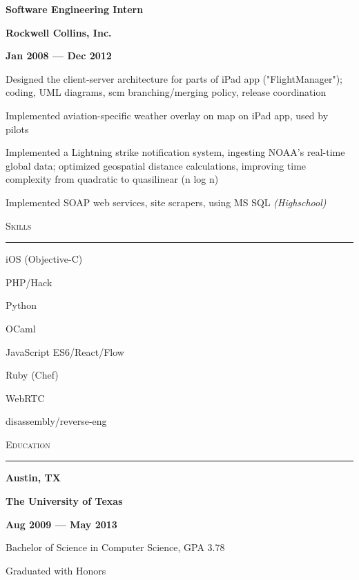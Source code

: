 \documentclass[letterpaper,12pt,oneside]{article}
\newcommand{\Heading}[1]{%
  \vspace{2ex}
  {\large\textsc{#1}} \\
  \vspace{-2ex}
  \hrule
}
\newcommand{\OneThirdBox}[1]{%
  \parbox{.333\textwidth}{#1}%
}
\newcommand{\LeftCenterRight}[4][\normalfont]{%
  \OneThirdBox{%
    \begin{flushleft}%
      #1{#2}%
    \end{flushleft}%
  }%
  \OneThirdBox{%
    \begin{center}%
      #1{#3}%
    \end{center}%
  }%
  \OneThirdBox{%
    \begin{flushright}%
      #1{#4}%
    \end{flushright}%
  }%
}
\newenvironment{Role}[4]
{
  \LeftCenterRight[\textbf]{#1}{#2}{#3 --- #4}
  \begin{compactitem}
  \vspace{-2ex}
}
{
  \end{compactitem}
  \vspace{-1ex}
}
\begin{document}
\begin{Role}
{Software Engineering Intern}
{Rockwell Collins, Inc.}
{Jan 2008}{Dec 2012}
  \item Designed the client-server architecture for parts of iPad app
    ("FlightManager"); coding, UML diagrams, scm branching/merging policy,
    release coordination
  \item Implemented aviation-specific weather overlay on map on iPad app, used
    by pilots
  \item Implemented a Lightning strike notification system, ingesting NOAA's
    real-time global data; optimized geospatial distance calculations,
    improving time complexity from quadratic to quasilinear (n log n)
  \item Implemented SOAP web services, site scrapers, using MS SQL
    \emph{(Highschool)}
\end{Role}


\Heading{Skills}
\vspace{2ex}
\begin{multicols}{3}
\small
\begin{compactitem}
  \item iOS (Objective-C)
  \item PHP/Hack
  \item Python
  \item OCaml
  \item JavaScript ES6/React/Flow
  \item Ruby (Chef)
  \item WebRTC
  \item disassembly/reverse-eng
\end{compactitem}
\normalsize
\end{multicols}

\pagebreak


\Heading{Education}

\begin{Role}
  {Austin, TX}
  {The University of Texas}
  {Aug 2009}
  {May 2013}
  \item Bachelor of Science in Computer Science, GPA 3.78
  \item Graduated with Honors
\end{Role}
\end{document}
